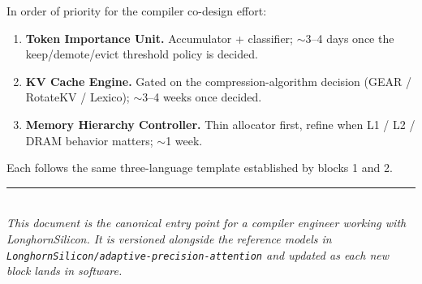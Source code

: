 \documentclass[11pt]{article}
\begin{document}
In order of priority for the compiler co-design effort:

\begin{enumerate}
\item \textbf{Token Importance Unit.} Accumulator + classifier;
      $\sim$3--4 days once the keep/demote/evict threshold policy
      is decided.
\item \textbf{KV Cache Engine.} Gated on the compression-algorithm
      decision (GEAR / RotateKV / Lexico); $\sim$3--4 weeks once
      decided.
\item \textbf{Memory Hierarchy Controller.} Thin allocator first,
      refine when L1 / L2 / DRAM behavior matters; $\sim$1 week.
\end{enumerate}

Each follows the same three-language template established by blocks
1 and 2.

\vspace{0.5in}
\noindent\rule{\textwidth}{0.4pt}\\
\noindent\small\textit{This document is the canonical entry point
for a compiler engineer working with LonghornSilicon. It is
versioned alongside the reference models in
\texttt{LonghornSilicon/adaptive-precision-attention} and updated
as each new block lands in software.}
\end{document}
